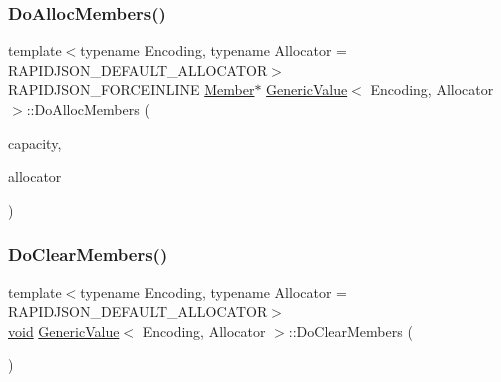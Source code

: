 \subsubsection{\texorpdfstring{Do\+Alloc\+Members()}{DoAllocMembers()}}
{\footnotesize\ttfamily template$<$typename Encoding, typename Allocator = R\+A\+P\+I\+D\+J\+S\+O\+N\+\_\+\+D\+E\+F\+A\+U\+L\+T\+\_\+\+A\+L\+L\+O\+C\+A\+T\+OR$>$ \\
R\+A\+P\+I\+D\+J\+S\+O\+N\+\_\+\+F\+O\+R\+C\+E\+I\+N\+L\+I\+NE \hyperlink{classGenericValue_a7ccf27c44058b4c11c3efc6473afb886}{Member}$\ast$ \hyperlink{classGenericValue}{Generic\+Value}$<$ Encoding, Allocator $>$\+::Do\+Alloc\+Members (\begin{DoxyParamCaption}\item[{\hyperlink{rapidjson_8h_a5ed6e6e67250fadbd041127e6386dcb5}{Size\+Type}}]{capacity,  }\item[{Allocator \&}]{allocator }\end{DoxyParamCaption})\hspace{0.3cm}{\ttfamily [inline]}}

\mbox{\label{classGenericValue_a4e2fbcde9054e87b591f79e6202a80d6}} 
\subsubsection{\texorpdfstring{Do\+Clear\+Members()}{DoClearMembers()}}
{\footnotesize\ttfamily template$<$typename Encoding, typename Allocator = R\+A\+P\+I\+D\+J\+S\+O\+N\+\_\+\+D\+E\+F\+A\+U\+L\+T\+\_\+\+A\+L\+L\+O\+C\+A\+T\+OR$>$ \\
\hyperlink{imgui__impl__opengl3__loader_8h_ac668e7cffd9e2e9cfee428b9b2f34fa7}{void} \hyperlink{classGenericValue}{Generic\+Value}$<$ Encoding, Allocator $>$\+::Do\+Clear\+Members (\begin{DoxyParamCaption}{ }\end{DoxyParamCaption})\hspace{0.3cm}{\ttfamily [inline]}}

\mbox{\label{classGenericValue_a17e90627a90a4e97e8425e0ca4a22cbb}} 
